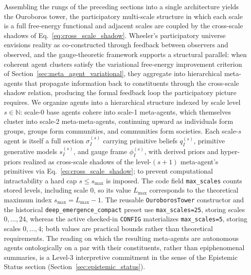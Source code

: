 \documentclass[11pt]{article}
\begin{document}
Assembling the rungs of the preceding sections into a single architecture yields the Ouroboros tower, the participatory multi-scale structure in which each scale is a full free-energy functional and adjacent scales are coupled by the cross-scale shadows of Eq.~\eqref{eq:cross_scale_shadow}. Wheeler's participatory universe~\cite{Wheeler1983} envisions reality as co-constructed through feedback between observers and observed, and the gauge-theoretic framework supports a structural parallel: when coherent agent clusters satisfy the variational free-energy improvement criterion of Section~\ref{sec:meta_agent_variational}, they aggregate into hierarchical meta-agents that propagate information back to constituents through the cross-scale shadow relation, producing the formal feedback loop the participatory picture requires. We organize agents into a hierarchical structure indexed by scale level $s \in \mathbb{N}$: scale-0 base agents cohere into scale-1 meta-agents, which themselves cluster into scale-2 meta-meta-agents, continuing upward as individuals form groups, groups form communities, and communities form societies. Each scale-$s$ agent is itself a full section $\sigma_I^{(s)}$ carrying primitive beliefs $q_I^{(s)}$, primitive generative models $s_I^{(s)}$, and gauge frame $\phi_I^{(s)}$, with derived priors and hyper-priors realized as cross-scale shadows of the level-$(s{+}1)$ meta-agent's primitives via Eq.~\eqref{eq:cross_scale_shadow}; to prevent computational intractability a hard cap $s \leq s_{\max}$ is imposed. The code field \texttt{max\_scales} counts stored levels, including scale 0, so its value \(L_{\max}\) corresponds to the theoretical maximum index \(s_{\max}=L_{\max}-1\). The reusable \texttt{OuroborosTower} constructor and the historical \texttt{deep\_emergence\_compact} preset use \texttt{max\_scales=25}, storing scales \(0,\ldots,24\), whereas the active checked-in \texttt{CONFIG} materializes \texttt{max\_scales=5}, storing scales \(0,\ldots,4\); both values are practical bounds rather than theoretical requirements. The reading on which the resulting meta-agents are autonomous agents ontologically on a par with their constituents, rather than epiphenomenal summaries, is a Level-3 interpretive commitment in the sense of the Epistemic Status section (Section~\ref{sec:epistemic_status}).
\end{document}
